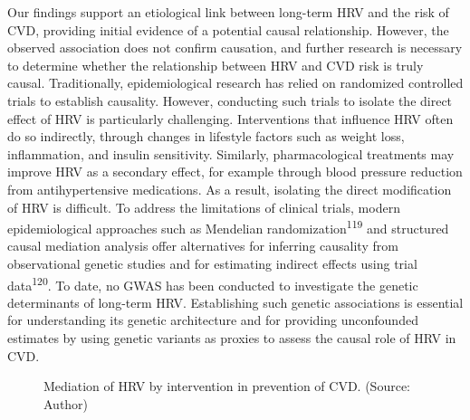 \documentclass[
  a4paper,
  headsepline=true,
  open=any]{scrbook}
\begin{document}
Our findings support an etiological link between long-term HRV and the
risk of CVD, providing initial evidence of a potential causal
relationship. However, the observed association does not confirm
causation, and further research is necessary to determine whether the
relationship between HRV and CVD risk is truly causal. Traditionally,
epidemiological research has relied on randomized controlled trials to
establish causality. However, conducting such trials to isolate the
direct effect of HRV is particularly challenging. Interventions that
influence HRV often do so indirectly, through changes in lifestyle
factors such as weight loss, inflammation, and insulin sensitivity.
Similarly, pharmacological treatments may improve HRV as a secondary
effect, for example through blood pressure reduction from
antihypertensive medications. As a result, isolating the direct
modification of HRV is difficult. To address the limitations of clinical
trials, modern epidemiological approaches such as Mendelian
randomization\textsuperscript{119} and structured causal mediation
analysis offer alternatives for inferring causality from observational
genetic studies and for estimating indirect effects using trial
data\textsuperscript{120}. To date, no GWAS has been conducted to
investigate the genetic determinants of long-term HRV. Establishing such
genetic associations is essential for understanding its genetic
architecture and for providing unconfounded estimates by using genetic
variants as proxies to assess the causal role of HRV in CVD.

\begin{figure}

\begin{minipage}[t]{\linewidth}

{\centering 


\caption{Mediation of HRV by intervention in prevention of CVD. (Source:
Author)}

}

\end{minipage}%

\end{figure}
\end{document}
